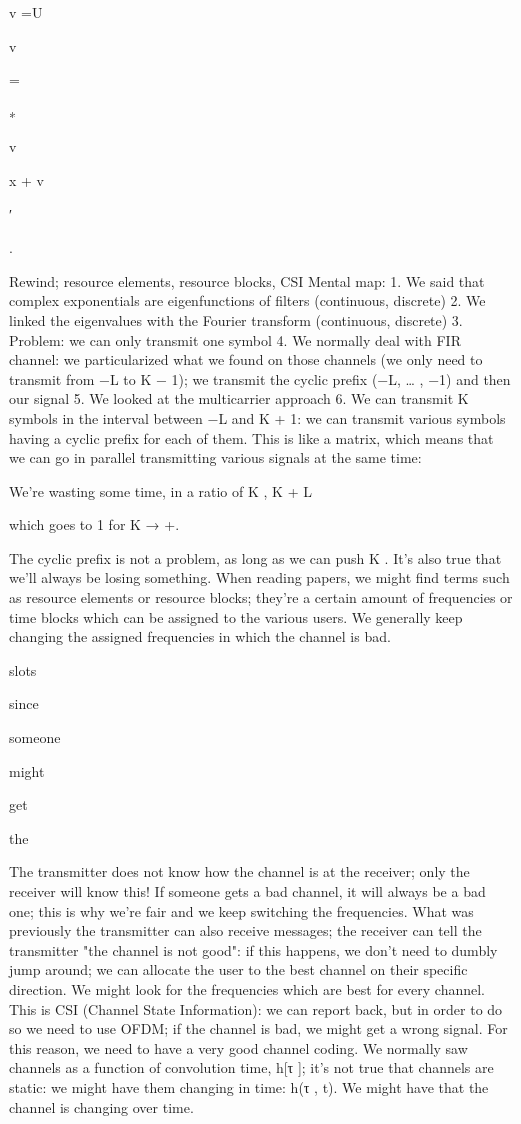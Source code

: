 {v =U

v

=

∗

v

x + v

′

.

Rewind; resource elements, resource blocks, CSI Mental map:
1. We said that complex exponentials are eigenfunctions of filters (continuous, discrete)
2. We linked the eigenvalues with the Fourier transform (continuous, discrete)
3. Problem: we can only transmit one symbol 4. We normally deal with FIR channel: we particularized what we found on those channels (we only need to transmit from −L to K − 1); we transmit the cyclic prefix
(−L, … , −1) and then our signal 5. We looked at the multicarrier approach 6. We can transmit K symbols in the interval between −L and K + 1: we can transmit various symbols having a cyclic prefix for each of them. This is like a matrix, which means that we can go in parallel transmitting various signals at the same time:

We're wasting some time, in a ratio of K
,
K + L

which goes to 1 for K → +\infty.

The cyclic prefix is not a problem, as long as we can push K . It's also true that we'll always be losing something.
When reading papers, we might find terms such as resource elements or resource blocks; they're a certain amount of frequencies or time blocks which can be assigned to the various users.
We generally keep changing the assigned frequencies in which the channel is bad.

slots

since

someone

might

get

the

The transmitter does not know how the channel is at the receiver; only the receiver will know this!
If someone gets a bad channel, it will always be a bad one; this is why we're fair and we keep switching the frequencies.
What was previously the transmitter can also receive messages; the receiver can tell the transmitter "the channel is not good": if this happens, we don't need to dumbly jump around; we can allocate the user to the best channel on their specific direction.
We might look for the frequencies which are best for every channel.
This is CSI (Channel State Information): we can report back, but in order to do so we need to use OFDM; if the channel is bad, we might get a wrong signal. For this reason,
we need to have a very good channel coding.
We normally saw channels as a function of convolution time, h[τ ]; it's not true that channels are static: we might have them changing in time: h(τ , t).
We might have that the channel is changing over time.

}
